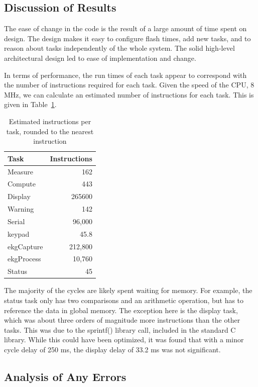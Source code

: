 \documentclass[12pt]{article} %
\begin{document}
    \subsection{Discussion of Results}
    The ease of change in the code is the result of a large amount of time spent on
    design. The design makes it easy to configure flash times, add new tasks, and
    to reason about tasks independently of the whole system. The solid high-level
    architectural design led to ease of implementation and change.

    In terms of performance, the run times of each task appear to correspond with
    the number of instructions required for each task. Given the speed of the CPU,
    8 MHz, we can calculate an estimated number of instructions for each task.
    This is given in Table~\ref{tab:instr}.
    \begin{table}[h]
      \centering
      \begin{tabular}{|l|r|} 
	\hline
	Task & Instructions \\ \hline
	Measure & 162 \\ \hline
	Compute & 443 \\ \hline
	Display & 265600 \\ \hline
	Warning & 142 \\ \hline
    Serial & 96,000 \\ \hline
    keypad & 45.8 \\ \hline
    ekgCapture & 212,800 \\ \hline
    ekgProcess & 10,760 \\ \hline
	Status & 45 \\ \hline
      \end{tabular}
      \caption{Estimated instructions per task, rounded to the nearest instruction}
      \label{tab:instr}
    \end{table}
    The majority of the cycles are likely spent waiting for memory. For example,
    the status task only has two comparisons and an arithmetic operation, but has
    to reference the data in global memory. The exception here is the display
    task, which was about three orders of magnitude more instructions than the
    other tasks. This was due to the sprintf() library call, included in the
    standard C library. While this could have been optimized, it was found that
    with a minor cycle delay of 250 ms, the display delay of 33.2 ms was not
    significant.


    \subsection{Analysis of Any Errors}
    
\end{document}
